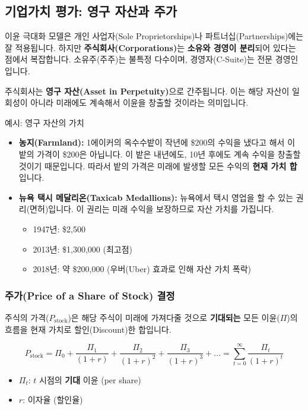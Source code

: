 \documentclass[11pt,a4paper]{article}
\theoremstyle{definition}
\begin{document}
\subsection{기업가치 평가: 영구 자산과 주가}

이윤 극대화 모델은 개인 사업자(Sole Proprietorships)나 파트너십(Partnerships)에는 잘 적용됩니다.
하지만 \textbf{주식회사(Corporations)}는 \textbf{소유와 경영이 분리}되어 있다는 점에서 복잡합니다.
소유주(주주)는 불특정 다수이며, 경영자(C-Suite)는 전문 경영인입니다.

주식회사는 \textbf{영구 자산(Asset in Perpetuity)}으로 간주됩니다.
이는 해당 자산이 일회성이 아니라 미래에도 계속해서 이윤을 창출할 것이라는 의미입니다.

\begin{mybox}{예시: 영구 자산의 가치}
\begin{itemize}
    \item \textbf{농지(Farmland):} 1에이커의 옥수수밭이 작년에 \$200의 수익을 냈다고 해서 이 밭의 가격이 \$200은 아닙니다. 이 밭은 내년에도, 10년 후에도 계속 수익을 창출할 것이기 때문입니다. 따라서 밭의 가격은 미래에 발생할 모든 수익의 \textbf{현재 가치 합}입니다.
    \item \textbf{뉴욕 택시 메달리온(Taxicab Medallions):} 뉴욕에서 택시 영업을 할 수 있는 권리(면허)입니다. 이 권리는 미래 수익을 보장하므로 자산 가치를 가집니다.
    \begin{itemize}
        \item 1947년: \$2,500
        \item 2013년: \$1,300,000 (최고점)
        \item 2018년: 약 \$200,000 (우버(Uber) 효과로 인해 자산 가치 폭락)
    \end{itemize}
\end{itemize}
\end{mybox}

\subsubsection{주가(Price of a Share of Stock) 결정}
주식의 가격($P_{\text{stock}}$)은 해당 주식이 미래에 가져다줄 것으로 \textbf{기대되는} 모든 이윤($\Pi$)의 흐름을 현재 가치로 할인(Discount)한 합입니다.

$$
P_{\text{stock}} = \Pi_0 + \frac{\Pi_1}{(1+r)} + \frac{\Pi_2}{(1+r)^2} + \frac{\Pi_3}{(1+r)^3} + \dots = \sum_{t=0}^{\infty} \frac{\Pi_t}{(1+r)^t}
$$

\begin{itemize}
    \item $\Pi_t$: $t$ 시점의 \textbf{기대} 이윤 (per share)
    \item $r$: 이자율 (할인율)
\end{itemize}
\end{document}
